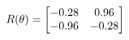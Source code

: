 \documentclass[preview]{standalone}
\begin{document}
\begin{align*}
\special{dvisvgm:raw <g id='unique000'>}R(\theta) = \begin{bmatrix}-0.28 & 0.96\\-0.96 & -0.28\end{bmatrix}\special{dvisvgm:raw </g>}
\end{align*}
\end{document}
